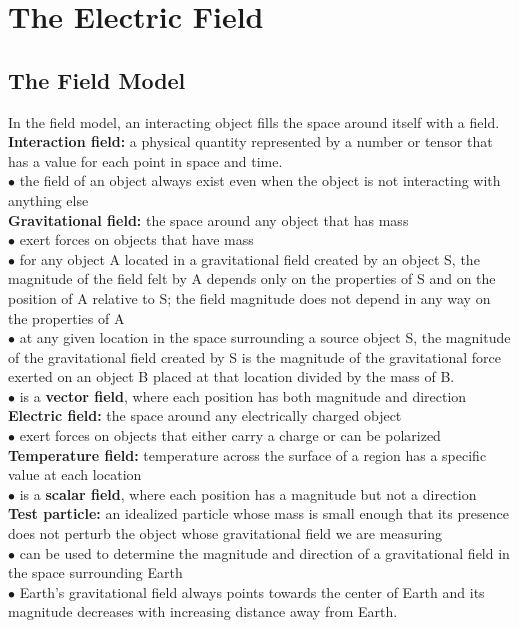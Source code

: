 \section{The Electric Field}

    \subsection{The Field Model}    %

        In the field model, an interacting object fills the space around itself with a field. \\

        \textbf{Interaction field:} a physical quantity represented by a number or tensor that has a value for each point in space and time. \\
        $\bullet$ the field of an object always exist even when the object is not interacting with anything else \\
        \textbf{Gravitational field:} the space around any object that has mass \\
        $\bullet$ exert forces on objects that have mass \\
        $\bullet$ for any object A located in a gravitational field created by an object S, the magnitude of the field felt by A depends only on the properties of S and on the position of A relative to S; the field
        magnitude does not depend in any way on the properties of A \\
        $\bullet$ at any given location in the space surrounding a source object S, the magnitude of the gravitational field created by S is the magnitude of the gravitational force exerted on an object B placed at that
        location divided by the mass of B. \\
        $\bullet$ is a \textbf{vector field}, where each position has both magnitude and direction \\
        \textbf{Electric field:} the space around any electrically charged object \\
        $\bullet$ exert forces on objects that either carry a charge or can be polarized \\
        \textbf{Temperature field:} temperature across the surface of a region has a specific value at each location \\
        $\bullet$ is a \textbf{scalar field}, where each position has a magnitude but not a direction \\

        \textbf{Test particle:} an idealized particle whose mass is small enough that its presence does not perturb the object whose gravitational field we are measuring \\
        $\bullet$ can be used to determine the magnitude and direction of a gravitational field in the space surrounding Earth \\
        $\bullet$ Earth's gravitational field always points towards the center of Earth and its magnitude decreases with increasing distance away from Earth.

